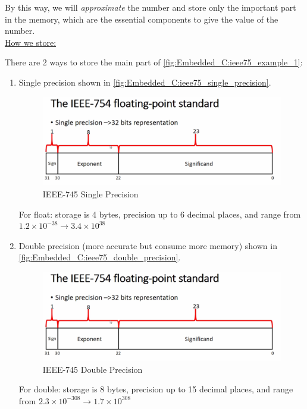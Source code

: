 By this way, we will \textit{approximate} the number and store only the important part in the memory, which are the essential components to give the value of the number.\\

\underline{How we store:}

There are 2 ways to store the main part of \autoref{fig:Embedded_C:ieee75_example_1}:

\begin{enumerate}
    \item Single precision shown in \autoref{fig:Embedded_C:ieee75_single_precision}. 
    
\begin{figure}[h]
\centering
\includegraphics[scale=0.5]{Figures/Embedded_C/ieee75_single_precision}
\caption{IEEE-745 Single Precision}
\label{fig:Embedded_C:ieee75_single_precision}
\end{figure} 

For float: storage is 4 bytes, precision up to 6 decimal places, and range from  $1.2 \times 10^{-38} \rightarrow 3.4 \times 10^{38}$
    
\newpage    
    \item Double precision (more accurate but consume more memory) shown in \autoref{fig:Embedded_C:ieee75_double_precision}.
    
\begin{figure}[h]
\centering
\includegraphics[scale=0.5]{Figures/Embedded_C/ieee75_single_precision}
\caption{IEEE-745 Double Precision}
\label{fig:Embedded_C:ieee75_double_precision}
\end{figure}

For double: storage is 8 bytes, precision up to 15 decimal places, and range from  $2.3 \times 10^{-308} \rightarrow 1.7 \times 10^{308}$
    
\end{enumerate}


